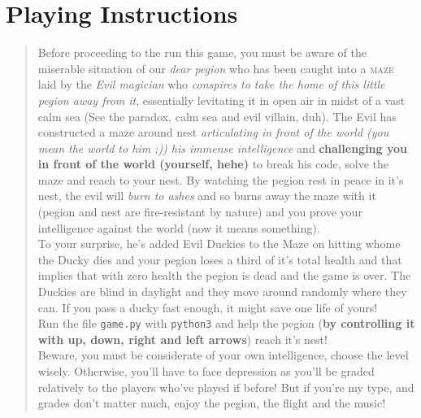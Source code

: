 \documentclass{article}
\begin{document}
\section{Playing Instructions}
\begin{quote}
    
    Before proceeding to the run this game, you must be aware of the miserable situation of our \textit{dear pegion} who has been caught into a \textsc{maze} laid by the \textit{Evil magician} who \textsl{conspires to take the home of this little pegion away from it}, essentially levitating it in open air in midst of a vast calm sea (See the paradox, calm sea and evil villain, duh).
    The Evil has constructed a maze around nest \textit{articulating in front of the world (you mean the world to him ;)) his immense intelligence} and \textbf{challenging you in front of the world (yourself, hehe)} to break his code, solve the maze and reach to your nest. By watching the pegion rest in peace in it's nest, the evil will \textit{burn to ashes} and so burns away the maze with it (pegion and nest are fire-resistant by nature) and you prove your intelligence against the world (now it means something).\\
    To your surprise, he's added Evil Duckies to the Maze on hitting whome the Ducky dies and your pegion loses a third of it's total health and that implies that with zero health the pegion is dead and the game is over. The Duckies are blind in daylight and they move around randomly where they can. If you pass a ducky fast enough, it might save one life of yours!\\
    Run the file \texttt{game.py} with \texttt{python3} and help the pegion (\textbf{by controlling it with up, down, right and left arrows}) reach it's nest!\\
    Beware, you must be considerate of your own intelligence, choose the level wisely. Otherwise, you'll have to face depression as you'll be graded relatively to the players who've played if before! But if you're my type, and grades don't matter much, enjoy the pegion, the flight and the music!\\
\end{quote}
\end{document}
